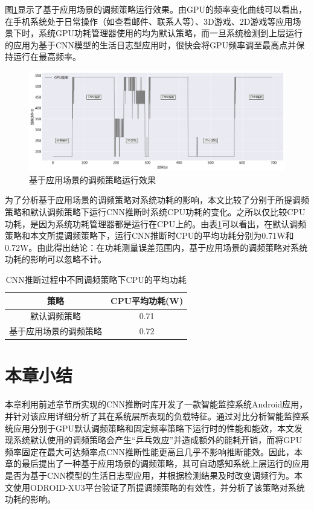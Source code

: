 图\ref{figure:figure42}显示了基于应用场景的调频策略运行效果。由GPU的频率变化曲线可以看出，在手机系统处于日常操作（如查看邮件、联系人等）、3D游戏、2D游戏等应用场景下时，系统GPU功耗管理器使用的均为默认策略，而一旦系统检测到上层运行的应用为基于CNN模型的生活日志型应用时，很快会将GPU频率调至最高点并保持运行在最高频率。

\begin{figure}[htbp]
    \centering
    \includegraphics[width=1.0\textwidth]{figures/system_governor.pdf}
    \caption{基于应用场景的调频策略运行效果}\label{figure:figure42}
\end{figure}

为了分析基于应用场景的调频策略对系统功耗的影响，本文比较了分别于所提调频策略和默认调频策略下运行CNN推断时系统CPU功耗的变化。之所以仅比较CPU功耗，是因为系统功耗管理器都是运行在CPU上的。由表\ref{table:table12}可以看出，在默认调频策略和本文所提调频策略下，运行CNN推断时CPU的平均功耗分别为0.71W和0.72W。由此得出结论：在功耗测量误差范围内，基于应用场景的调频策略对系统功耗的影响可以忽略不计。

\begin{table}[htbp]
  \centering
  \caption{CNN推断过程中不同调频策略下CPU的平均功耗}
  \label{table:table12}
  \begin{tabular}{cc}
    \toprule
      策略 & CPU平均功耗(W) \\
    \midrule
      默认调频策略 & 0.71 \\
      基于应用场景的调频策略 & 0.72 \\
    \bottomrule
  \end{tabular}
\end{table}

\section{本章小结}
本章利用前述章节所实现的CNN推断时库开发了一款智能监控系统Android应用，并针对该应用详细分析了其在系统层所表现的负载特征。通过对比分析智能监控系统应用分别于GPU默认调频策略和固定频率策略下运行时的性能和能效，本文发现系统默认使用的调频策略会产生“乒乓效应”并造成额外的能耗开销，而将GPU频率固定在最大可达频率点CNN推断性能更高且几乎不影响推断能效。因此，本章的最后提出了一种基于应用场景的调频策略，其可自动感知系统上层运行的应用是否为基于CNN模型的生活日志型应用，并根据检测结果及时改变调频行为。本文使用ODROID-XU3平台验证了所提调频策略的有效性，并分析了该策略对系统功耗的影响。

\cleardoublepage 